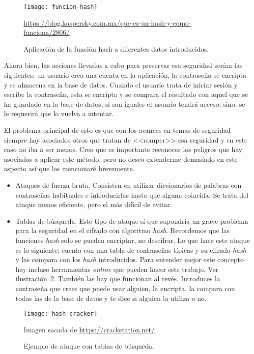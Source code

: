 \begin{figure}[h]
\centering
\texttt{[image: funcion-hash]}
\caption{Aplicación de la función hash a diferentes datos introducidos.}{\url{https://blog.kaspersky.com.mx/que-es-un-hash-y-como-funciona/2806/}}
\label{fig:3.1}
\end{figure}

Ahora bien, las acciones llevadas a cabo para preservar esa seguridad serían las siguientes: un usuario crea una cuenta en la aplicación, la contraseña se encripta y se almacena en la base de datos. Cuando el usuario trata de iniciar sesión y escribe la contraseña, esta se encripta y se compara el resultado con aquel que se ha guardado en la base de datos, si son iguales el usuario tendrá acceso; sino, se le requerirá que lo vuelva a intentar.

El problema principal de esto es que con los avances en temas de seguridad siempre hay asociados otros que tratan de <<romper>> esa seguridad y en este caso no iba a ser menos. Creo que es importante reconocer los peligros que hay asociados a aplicar este método, pero no deseo extenderme demasiado en este aspecto así que los mencionaré brevemente.


\begin{itemize}
\item Ataques de fuerza bruta. Consisten en utilizar diccionarios de palabras con contraseñas habituales e introducirlas hasta que alguna coincida. Se trata del ataque menos eficiente, pero el más difícil de evitar.
\item Tablas de búsqueda. Este tipo de ataque sí que supondría un grave problema para la seguridad en el cifrado con algoritmo \emph{hash}. Recordemos que las funciones \emph{hash} solo se pueden encriptar, no descifrar. Lo que hace este ataque es lo siguiente: cuenta con una tabla de contraseñas típicas y su cifrado \emph{hash} y las compara con los \emph{hash} introducidos. Para entender mejor este concepto hay incluso herramientas \emph{online} que pueden hacer este trabajo. Ver ilustración~\ref{fig:3.2}. También las hay que funcionan al revés. Introduces la contraseña que crees que puede usar alguien, la encripta, la compara con todas las de la base de datos y te dice si alguien la utiliza o no.
\end{itemize}

\begin{figure}[h]
\centering
\texttt{[image: hash-cracker]}
\caption{Ejemplo de ataque con tablas de búsqueda.}{Imagen sacada de \url{https://crackstation.net/}}
\label{fig:3.2}
\end{figure}


